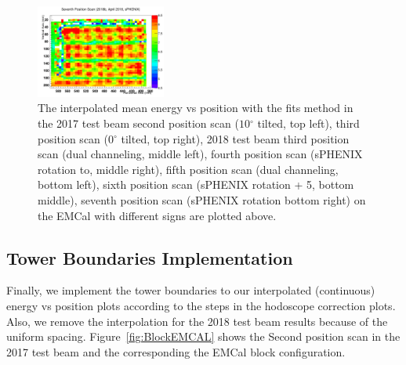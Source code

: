 \documentclass[hidelinks,11pt]{article}
\numberwithin{figure}{section}
\numberwithin{table}{section}
\newcommand{\degree}{\mbox{$^\circ$}\xspace}
\begin{document}
\begin{figure}[hbtp]
\begin{center}
\includegraphics[width=0.38\textwidth]{Plots/InterFits/Inter20187thScan.png}
\caption{The interpolated mean energy vs position with the fits method in the 2017 test beam second position scan ($10 \degree$ tilted, top left), third position scan ($0 \degree$ tilted, top right), 2018 test beam third position scan (dual channeling, middle left), fourth position scan (sPHENIX rotation to, middle right), fifth position scan (dual channeling, bottom left), sixth position scan (sPHENIX rotation + 5, bottom middle),  seventh position scan (sPHENIX rotation bottom right) on the EMCal with different signs are plotted above.}
\label{fig:FitsMethods}
\end{center}
\end{figure} 

\subsection{Tower Boundaries Implementation}

Finally, we implement the tower boundaries to our interpolated (continuous) energy vs position plots according to the steps in the hodoscope correction plots. Also, we remove the interpolation for the 2018 test beam results because of the uniform spacing. Figure~\ref{fig:BlockEMCAL} shows the Second position scan in the 2017 test beam and the corresponding the EMCal block configuration. 
\end{document}
